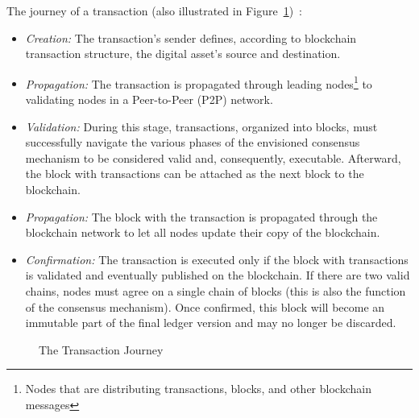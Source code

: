 \bigskip

\noindent The journey of a transaction (also illustrated in Figure~\ref{figure:bc.transaction})~\cite{vademecun.blockchain}:

\begin{itemize}
    \item \emph{Creation:} The transaction's sender defines, according to blockchain transaction structure, the digital asset's source and destination.
    \item \emph{Propagation:} The transaction is propagated through leading nodes\footnote{Nodes that are distributing transactions, blocks, and other blockchain messages} to validating nodes in a Peer-to-Peer (P2P) network.
    \item \emph{Validation:} During this stage, transactions, organized into blocks, must successfully navigate the various phases of the envisioned consensus mechanism to be considered valid and, consequently, executable. Afterward, the block with transactions can be attached as the next block to the blockchain.
    \item \emph{Propagation:} The block with the transaction is propagated through the blockchain network to let all nodes update their copy of the blockchain.
    \item \emph{Confirmation:} The transaction is executed only if the block with transactions is validated and eventually published on the blockchain. If there are two valid chains, nodes must agree on a single chain of blocks (this is also the function of the consensus mechanism). Once confirmed, this block will become an immutable part of the final ledger version and may no longer be discarded.
\end{itemize}


\begin{figure}[h]
    \begin{center}
    \end{center}
    \caption{The Transaction Journey~\cite{vademecun.blockchain}}
    \label{figure:bc.transaction}
\end{figure}

